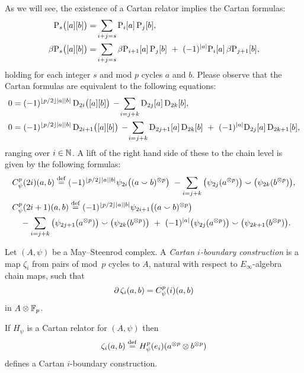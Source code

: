 As we will see, the existence of a Cartan relator implies the Cartan formulas:
\begin{align*}
	\mathrm{P}_s\big([a][b]\big) =&
	\sum_{i+j=s} \mathrm{P}_i[a] \, \mathrm{P}_j[b], \\
	\beta\mathrm{P}_s\big([a][b]\big) =&
	\sum_{i+j=s} \beta\mathrm{P}_{i+1}[a] \, \mathrm{P}_j[b] \ +\ (-1)^{\lvert a\rvert} \mathrm{P}_i[a] \, \beta\mathrm{P}_{j+1}[b],
\end{align*}
holding for each integer $s$ and mod $p$ cycles $a$ and $b$.
Please observe that the Cartan formulas are equivalent to the following equations:
\begin{align*}
	0 &= (-1)^{\floor{p/2}\bars{a}\bars{b}} \, \rD_{2i}\big([a][b]\big) \,-\!
	\sum_{i=j+k} \rD_{2j}[a] \, \rD_{2k}[b], \\
	0 &= (-1)^{\floor{p/2}\bars{a}\bars{b}} \, \rD_{2i+1}\big([a][b]\big) \,-\!
	\sum_{i=j+k} \rD_{2j+1}[a] \, \rD_{2k}[b] \ +\ (-1)^{\bars{a}}\rD_{2j}[a] \, \rD_{2k+1}[b],
\end{align*}
ranging over $i \in \mathbb{N}$.
A lift of the right hand side of these to the chain level is given by the following formulas:
\begin{align*}
	&C_\psi^p(2i)(a,b) \stackrel{\mathrm{def}}{=} (-1)^{\lfloor p/2\rfloor\lvert a\rvert\lvert b\rvert} \psi_{2i}\big((a \smallsmile b)^{\otimes p}\big) \ -
	\sum_{i=j+k}\big(\psi_{2j}(a^{\otimes p})\big) \smallsmile \big(\psi_{2k}(b^{\otimes p})\big), \\
	&C_\psi^p(2i+1)(a,b) \stackrel{\mathrm{def}}{=} (-1)^{\lfloor p/2\rfloor\lvert a\rvert\lvert b\rvert} \psi_{2i+1}\big((a \smallsmile b)^{\otimes p}\big) \\
	&\quad -\sum_{i=j+k} \big(\psi_{2j+1}(a^{\otimes p})\big) \smallsmile \big(\psi_{2k}(b^{\otimes p})\big)\ +\
	(-1)^{\lvert a\rvert}\big(\psi_{2j}(a^{\otimes p})\big) \smallsmile \big(\psi_{2k+1}(b^{\otimes p})\big).
\end{align*}

\begin{definition*}
	Let $(A,\psi)$ be a May--Steenrod complex.
	A \textit{Cartan $i$-boundary construction} is a map $\zeta_i$ from pairs of mod~$p$ cycles to $A$, natural with respect to $E_\infty$-algebra chain maps, such that
	\[
	\operatorname{\partial} \zeta_i(a,b) = C_\psi^p(i)(a, b)
	\]
	in $A \otimes {\mathbb{F}_p}$.

\end{definition*}

\begin{theorem*}
	If $H_\psi$ is a Cartan relator for $(A, \psi)$ then
	\[
	\zeta_i(a,b) \stackrel{\mathrm{def}}{=} H_\psi^p(e_i)(a^{\otimes p} \otimes b^{\otimes p})
	\]
	defines a Cartan $i$-boundary construction.
\end{theorem*}


